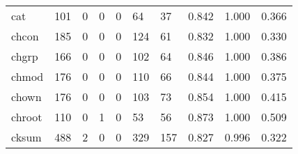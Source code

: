\begin{longtable}{lp{2.0cm}p{2.0cm}p{2.0cm}p{2.0cm}p{2.0cm}p{2.0cm}p{2.0cm}p{2.0cm}p{2.0cm}}
cat       &                    101 &                                             0 &                                            0 &                                           0 &                                           64 &                                         37 &                                0.842 &                                  1.000 &                                0.366 \\
chcon     &                    185 &                                             0 &                                            0 &                                           0 &                                          124 &                                         61 &                                0.832 &                                  1.000 &                                0.330 \\
chgrp     &                    166 &                                             0 &                                            0 &                                           0 &                                          102 &                                         64 &                                0.846 &                                  1.000 &                                0.386 \\
chmod     &                    176 &                                             0 &                                            0 &                                           0 &                                          110 &                                         66 &                                0.844 &                                  1.000 &                                0.375 \\
chown     &                    176 &                                             0 &                                            0 &                                           0 &                                          103 &                                         73 &                                0.854 &                                  1.000 &                                0.415 \\
chroot    &                    110 &                                             0 &                                            1 &                                           0 &                                           53 &                                         56 &                                0.873 &                                  1.000 &                                0.509 \\
cksum     &                    488 &                                             2 &                                            0 &                                           0 &                                          329 &                                        157 &                                0.827 &                                  0.996 &                                0.322 \\

\end{longtable}

